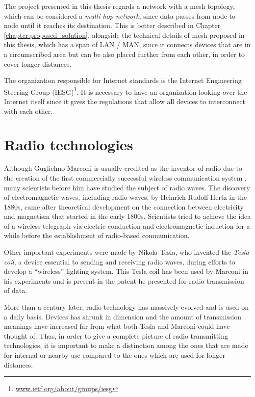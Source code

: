 		The project presented in this thesis regards a network with a mesh topology, which can be considered a \textit{multi-hop network}, since data passes from node to node until it reaches its destination.
		This is better described in Chapter \ref{chapter:proposed_solution}, alongside the technical details of mesh proposed in this thesis, which has a span of LAN / MAN, since it connects devices that are in a circumscribed area but can be also placed further from each other, in order to cover longer distances.
			
		The organization responsible for Internet standards is the Internet Engineering Steering Group (IESG)\footnote{ \url{www.ietf.org/about/groups/iesg}}.
		It is necessary to have an organization looking over the Internet itself since it gives the regulations that allow all devices to interconnect with each other.
	
	\section{Radio technologies}\label{sec:radio_tech}
		
		Although Guglielmo Marconi is usually credited as the inventor of radio due to the creation of the first commercially successful wireless communication system \cite{4137304}, many scientists before him have studied the subject of radio waves.
		The discovery of electromagnetic waves, including radio waves, by Heinrich Rudolf Hertz in the 1880s, came after theoretical development on the connection between electricity and magnetism that started in the early 1800s.
		Scientists tried to achieve the idea of a wireless telegraph via electric conduction and electromagnetic induction for a while before the establishment of radio-based communication.
		
		Other important experiments were made by Nikola Tesla, who invented the \textit{Tesla coil}, a device essential to sending and receiving radio waves, during efforts to develop a ``wireless'' lighting system.
		This Tesla coil has been used by Marconi in his experiments and is present in the patent he presented for radio transmission of data.
		
		More than a century later, radio technology has massively evolved and is used on a daily basis.
		Devices has shrunk in dimension and the amount of transmission meanings have increased far from what both Tesla and Marconi could have thought of.
		Thus, in order to give a complete picture of radio transmitting technologies, it is important to make a distinction among the ones that are made for internal or nearby use compared to the ones which are used for longer distances.
		
